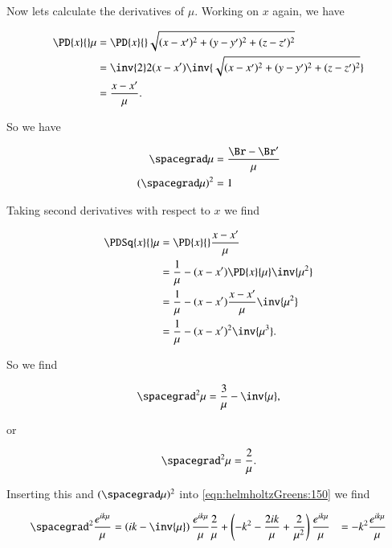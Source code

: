 Now lets calculate the derivatives of $\mu$.  Working on $x$ again, we have

\begin{align*}
\PD{x}{} \mu
&=
\PD{x}{} \sqrt{ 
(x - x')^2 
+(y - y')^2 
+(z - z')^2 
} \\
&=
\inv{2} 2 (x - x')
\inv{\sqrt{ 
(x - x')^2 
+(y - y')^2 
+(z - z')^2 
}} \\
&=
\frac{x - x'}{\mu}.
\end{align*}

So we have

\begin{align}\label{eqn:helmholtzGreens:170}
\spacegrad \mu &= \frac{\Br - \Br'}{\mu} \\
(\spacegrad \mu)^2 &= 1 
\end{align}

Taking second derivatives with respect to $x$ we find

\begin{align*}
\PDSq{x}{} \mu
&= \PD{x}{}
\frac{x - x'}{\mu} \\
&= 
\frac{1}{\mu} 
- (x - x') \PD{x}{\mu} \inv{\mu^2}
\\
&=
\frac{1}{\mu} 
- (x - x') \frac{x - x'}{\mu} \inv{\mu^2}
\\
&=
\frac{1}{\mu} 
- (x - x')^2 \inv{\mu^3}.
\end{align*}

So we find

\begin{equation}\label{eqn:helmholtzGreens:190}
\spacegrad^2 \mu = 
\frac{3}{\mu} 
- \inv{\mu},
\end{equation}

or

\begin{equation}\label{eqn:helmholtzGreens:210}
\spacegrad^2 \mu = \frac{2}{\mu}.
\end{equation}

Inserting this and $(\spacegrad \mu)^2$ into \ref{eqn:helmholtzGreens:150} we find

\begin{equation}\label{eqn:helmholtzGreens:220}
\begin{aligned}
\spacegrad^2
\frac{e^{i k \mu} }{\mu} 
&=
\left( i k - \inv{\mu} \right) \frac{e^{i k \mu}}{\mu} \frac{2}{\mu}
+
\left( -k^2 - \frac{ 2 i k }{\mu} + \frac{2}{\mu^2} \right)
\frac{e^{i k \mu}}{\mu}
&=
-k^2 \frac{e^{i k \mu}}{\mu}
\end{aligned}
\end{equation}

